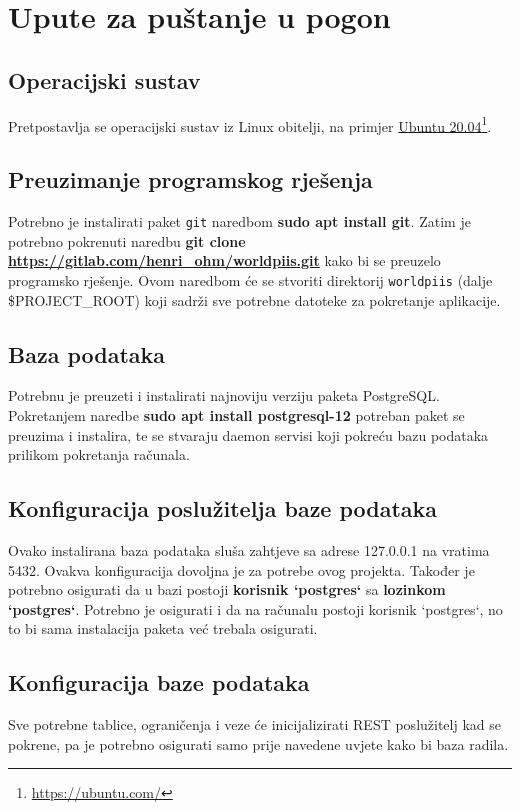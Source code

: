 			\eject 
		
		\section{Upute za puštanje u pogon}
		
		\subsection{Operacijski sustav}
		Pretpostavlja se operacijski sustav iz Linux obitelji, na primjer \underline{Ubuntu 20.04}\footnote{\url{https://ubuntu.com/}}.
		
		\subsection{Preuzimanje programskog rješenja}
		Potrebno je instalirati paket \texttt{git} naredbom \textbf{sudo apt install git}. Zatim je potrebno pokrenuti naredbu \textbf{git clone \url{https://gitlab.com/henri_ohm/worldpiis.git}} kako bi se preuzelo programsko rješenje. Ovom naredbom će se stvoriti direktorij \texttt{worldpiis} (dalje \$PROJECT\_ROOT) koji sadrži sve potrebne datoteke za pokretanje aplikacije.
		
		\subsection{Baza podataka}
		Potrebnu je preuzeti i instalirati najnoviju verziju paketa PostgreSQL. Pokretanjem naredbe \textbf{sudo apt install postgresql-12} potreban paket se preuzima i instalira, te se stvaraju daemon servisi koji pokreću bazu podataka prilikom pokretanja računala.
		
		\subsection{Konfiguracija poslužitelja baze podataka}
		Ovako instalirana baza podataka sluša zahtjeve sa adrese 127.0.0.1 na vratima 5432. Ovakva konfiguracija dovoljna je za potrebe ovog projekta. Također je potrebno osigurati da u bazi postoji \textbf{korisnik `postgres`} sa \textbf{lozinkom `postgres`}. Potrebno je osigurati i da na računalu postoji korisnik `postgres`, no to bi sama instalacija paketa već trebala osigurati.
		
		\subsection{Konfiguracija baze podataka}
		Sve potrebne tablice, ograničenja i veze će inicijalizirati REST poslužitelj kad se pokrene, pa je potrebno osigurati samo prije navedene uvjete kako bi baza radila.
		
